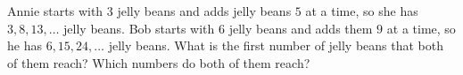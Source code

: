 Annie starts with $3$ jelly beans and adds jelly beans $5$ at a time, so she has $3, 8, 13, \dots$ jelly beans. Bob starts with $6$ jelly beans and adds them $9$ at a time, so he has $6, 15, 24, \dots$ jelly beans. What is the first number of jelly beans that both of them reach? Which numbers do both of them reach?
